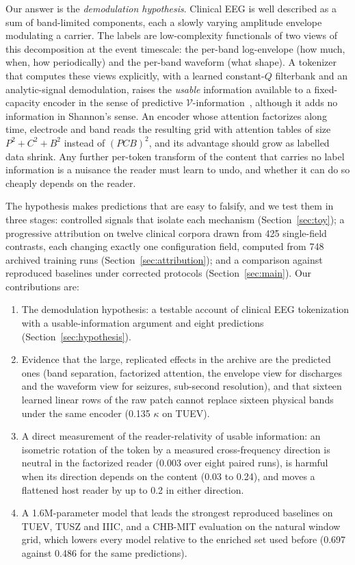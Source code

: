 Our answer is the \emph{demodulation hypothesis}. Clinical EEG is well described as a sum of band-limited components, each a slowly varying amplitude envelope modulating a carrier. The labels are low-complexity functionals of two views of this decomposition at the event timescale: the per-band log-envelope (how much, when, how periodically) and the per-band waveform (what shape). A tokenizer that computes these views explicitly, with a learned constant-$Q$ filterbank and an analytic-signal demodulation, raises the \emph{usable} information available to a fixed-capacity encoder in the sense of predictive $\mathcal{V}$-information~\cite{xu2020usable}, although it adds no information in Shannon's sense. An encoder whose attention factorizes along time, electrode and band reads the resulting grid with attention tables of size $P^2 + C^2 + B^2$ instead of $(PCB)^2$, and its advantage should grow as labelled data shrink. Any further per-token transform of the content that carries no label information is a nuisance the reader must learn to undo, and whether it can do so cheaply depends on the reader.

The hypothesis makes predictions that are easy to falsify, and we test them in three stages: controlled signals that isolate each mechanism (Section~\ref{sec:toy}); a progressive attribution on twelve clinical corpora drawn from 425 single-field contrasts, each changing exactly one configuration field, computed from 748 archived training runs (Section~\ref{sec:attribution}); and a comparison against reproduced baselines under corrected protocols (Section~\ref{sec:main}). Our contributions are:
\begin{enumerate}
\item The demodulation hypothesis: a testable account of clinical EEG tokenization with a usable-information argument and eight predictions (Section~\ref{sec:hypothesis}).
\item Evidence that the large, replicated effects in the archive are the predicted ones (band separation, factorized attention, the envelope view for discharges and the waveform view for seizures, sub-second resolution), and that sixteen learned linear rows of the raw patch cannot replace sixteen physical bands under the same encoder (0.135 $\kappa$ on TUEV).
\item A direct measurement of the reader-relativity of usable information: an isometric rotation of the token by a measured cross-frequency direction is neutral in the factorized reader (0.003 over eight paired runs), is harmful when its direction depends on the content (0.03 to 0.24), and moves a flattened host reader by up to 0.2 in either direction.
\item A 1.6M-parameter model that leads the strongest reproduced baselines on TUEV, TUSZ and IIIC, and a CHB-MIT evaluation on the natural window grid, which lowers every model relative to the enriched set used before (0.697 against 0.486 for the same predictions).
\end{enumerate}
